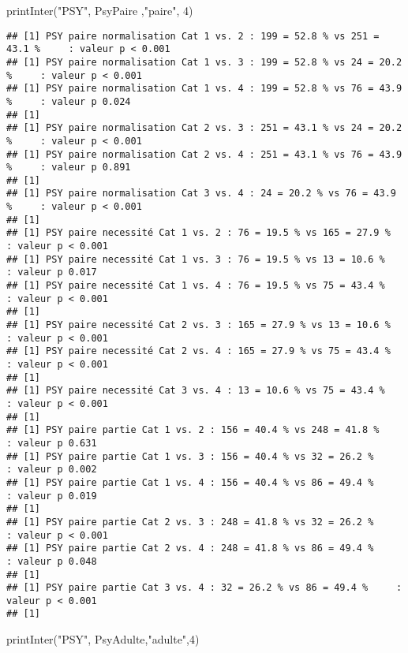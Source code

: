 \documentclass[
]{article}
\newenvironment{Shaded}{\begin{snugshade}}{\end{snugshade}}
\newcommand{\DecValTok}[1]{\textcolor[rgb]{0.00,0.00,0.81}{#1}}
\newcommand{\FunctionTok}[1]{\textcolor[rgb]{0.00,0.00,0.00}{#1}}
\newcommand{\NormalTok}[1]{#1}
\newcommand{\StringTok}[1]{\textcolor[rgb]{0.31,0.60,0.02}{#1}}
\begin{document}
\newpage

\begin{Shaded}
\begin{Highlighting}[]
\FunctionTok{printInter}\NormalTok{(}\StringTok{"PSY"}\NormalTok{, PsyPaire ,}\StringTok{"paire"}\NormalTok{, }\DecValTok{4}\NormalTok{)}
\end{Highlighting}
\end{Shaded}

\begin{verbatim}
## [1] PSY paire normalisation Cat 1 vs. 2 : 199 = 52.8 % vs 251 = 43.1 %     : valeur p < 0.001
## [1] PSY paire normalisation Cat 1 vs. 3 : 199 = 52.8 % vs 24 = 20.2 %     : valeur p < 0.001
## [1] PSY paire normalisation Cat 1 vs. 4 : 199 = 52.8 % vs 76 = 43.9 %     : valeur p 0.024
## [1] 
## [1] PSY paire normalisation Cat 2 vs. 3 : 251 = 43.1 % vs 24 = 20.2 %     : valeur p < 0.001
## [1] PSY paire normalisation Cat 2 vs. 4 : 251 = 43.1 % vs 76 = 43.9 %     : valeur p 0.891
## [1] 
## [1] PSY paire normalisation Cat 3 vs. 4 : 24 = 20.2 % vs 76 = 43.9 %     : valeur p < 0.001
## [1] 
## [1] PSY paire necessité Cat 1 vs. 2 : 76 = 19.5 % vs 165 = 27.9 %     : valeur p < 0.001
## [1] PSY paire necessité Cat 1 vs. 3 : 76 = 19.5 % vs 13 = 10.6 %     : valeur p 0.017
## [1] PSY paire necessité Cat 1 vs. 4 : 76 = 19.5 % vs 75 = 43.4 %     : valeur p < 0.001
## [1] 
## [1] PSY paire necessité Cat 2 vs. 3 : 165 = 27.9 % vs 13 = 10.6 %     : valeur p < 0.001
## [1] PSY paire necessité Cat 2 vs. 4 : 165 = 27.9 % vs 75 = 43.4 %     : valeur p < 0.001
## [1] 
## [1] PSY paire necessité Cat 3 vs. 4 : 13 = 10.6 % vs 75 = 43.4 %     : valeur p < 0.001
## [1] 
## [1] PSY paire partie Cat 1 vs. 2 : 156 = 40.4 % vs 248 = 41.8 %     : valeur p 0.631
## [1] PSY paire partie Cat 1 vs. 3 : 156 = 40.4 % vs 32 = 26.2 %     : valeur p 0.002
## [1] PSY paire partie Cat 1 vs. 4 : 156 = 40.4 % vs 86 = 49.4 %     : valeur p 0.019
## [1] 
## [1] PSY paire partie Cat 2 vs. 3 : 248 = 41.8 % vs 32 = 26.2 %     : valeur p < 0.001
## [1] PSY paire partie Cat 2 vs. 4 : 248 = 41.8 % vs 86 = 49.4 %     : valeur p 0.048
## [1] 
## [1] PSY paire partie Cat 3 vs. 4 : 32 = 26.2 % vs 86 = 49.4 %     : valeur p < 0.001
## [1]
\end{verbatim}

\begin{Shaded}
\begin{Highlighting}[]
\FunctionTok{printInter}\NormalTok{(}\StringTok{"PSY"}\NormalTok{, PsyAdulte,}\StringTok{"adulte"}\NormalTok{,}\DecValTok{4}\NormalTok{)}
\end{Highlighting}
\end{Shaded}
\end{document}
